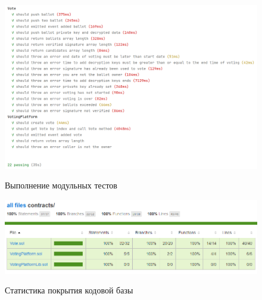 \begin{figure}[H]
\begin{center}
\includegraphics[width=1.0\hsize]{fig/unit-tests.png}\\[2mm]
\caption{Выполнение модульных тестов}\label{fig:unittest}
\end{center}
\end{figure}

\begin{figure}[H]
\begin{center}
\includegraphics[width=1.0\hsize]{fig/coverage.png}\\[2mm]
\caption{Статистика покрытия кодовой базы}\label{fig:coverage}
\end{center}
\end{figure}